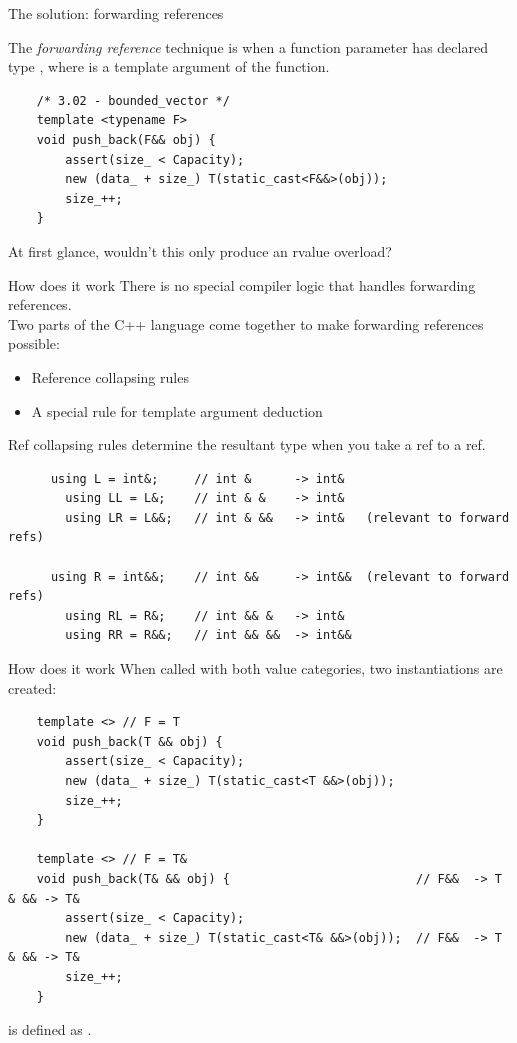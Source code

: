 \begin{frame}[fragile]{The solution: forwarding references}
  \begin{sqt:definition}
    The \emph{forwarding reference} technique is when a function parameter has declared type
    , where  is a template argument of the function.
  \end{sqt:definition}

  \begin{verbatim}
    /* 3.02 - bounded_vector */
    template <typename F>
    void push_back(F&& obj) {
        assert(size_ < Capacity);
        new (data_ + size_) T(static_cast<F&&>(obj));
        size_++;
    }
  \end{verbatim}

  At first glance, wouldn't this only produce an rvalue overload?
\end{frame}

\begin{frame}[fragile]{How does it work}
  There is no special compiler logic that handles forwarding references.\\
  Two parts of the C++ language come together to make forwarding references possible:
  \begin{itemize}
    \item Reference collapsing rules
    \item A special rule for template argument deduction
  \end{itemize}

  Ref collapsing rules determine the resultant type when you take a ref to a ref.

  \begin{verbatim}
      using L = int&;     // int &      -> int&
        using LL = L&;    // int & &    -> int&
        using LR = L&&;   // int & &&   -> int&   (relevant to forward refs)

      using R = int&&;    // int &&     -> int&&  (relevant to forward refs)
        using RL = R&;    // int && &   -> int&
        using RR = R&&;   // int && &&  -> int&&
  \end{verbatim}
\end{frame}


\begin{frame}[fragile]{How does it work}
  When called with both value categories, two instantiations are created:
  \begin{verbatim}
    template <> // F = T
    void push_back(T && obj) {
        assert(size_ < Capacity);
        new (data_ + size_) T(static_cast<T &&>(obj));
        size_++;
    }

    template <> // F = T&
    void push_back(T& && obj) {                          // F&&  -> T & && -> T&
        assert(size_ < Capacity);
        new (data_ + size_) T(static_cast<T& &&>(obj));  // F&&  -> T & && -> T&
        size_++;
    }
  \end{verbatim}

  \begin{sqt:definition}
     is defined as .
  \end{sqt:definition}
\end{frame}

